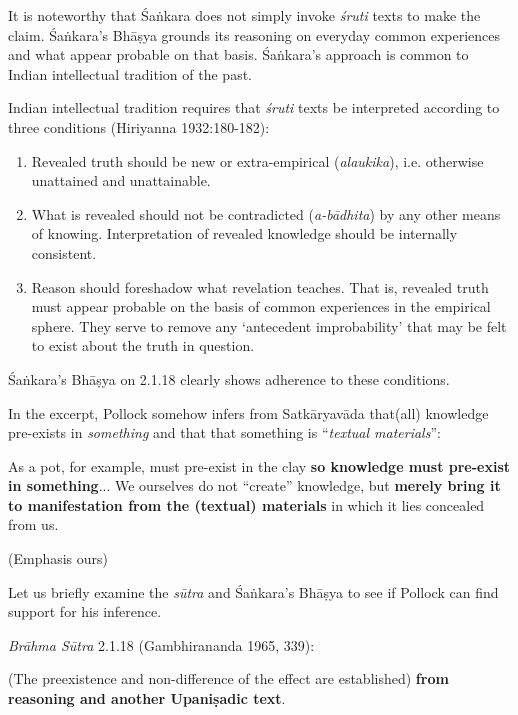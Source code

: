 It is noteworthy that Śaṅkara does not simply invoke {\sl śruti} texts to make the claim.  Śaṅkara's Bhāṣya grounds its reasoning on everyday common experiences and what appear probable on that basis.  Śaṅkara's approach is common to Indian intellectual tradition of the past.

Indian intellectual tradition requires that {\sl śruti} texts be interpreted according to three conditions (Hiriyanna 1932:180-182):
\begin{enumerate}
\item Revealed truth should be new or extra-empirical ({\sl alaukika}), i.e. otherwise unattained and unattainable.

\item What is revealed should not be contradicted ({\sl a-bādhita}) by any other means of knowing. Interpretation of revealed knowledge should be internally consistent.


\item Reason should foreshadow what revelation teaches. That is, revealed truth must appear probable on the basis of common experiences in the empirical sphere. They serve to remove any `antecedent improbability' that may be felt to exist about the truth in question.
\end{enumerate}

Śaṅkara's Bhāṣya on 2.1.18 clearly shows adherence to these conditions.

In the excerpt, Pollock somehow infers from Satkāryavāda that(all) knowledge pre-exists in {\sl something} and that that something is ``{\sl textual materials}'':
\begin{myquote}
As a pot, for example, must pre-exist in the clay {\bf so knowledge must pre-exist in something}... We ourselves do not ``create'' knowledge, but {\bf merely bring it to manifestation from the (textual) materials} in which it lies concealed from us. 

\hfill (Emphasis ours)
\end{myquote}

Let us briefly examine the {\sl sūtra} and Śaṅkara's Bhāṣya to see if Pollock can find support for his inference.

{\sl Brāhma Sūtra} 2.1.18 (Gambhirananda 1965, 339):
\begin{myquote}
(The preexistence and non-difference of the effect are established) \textbf{from reasoning and another Upaniṣadic text}.
\end{myquote}

